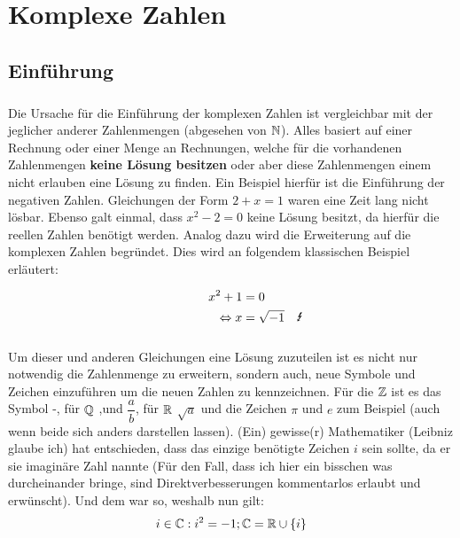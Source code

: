 \chapter{Komplexe Zahlen}


\section{Einführung}

	\paragraph{} Die Ursache für die Einführung der komplexen Zahlen ist vergleichbar mit der jeglicher anderer Zahlenmengen (abgesehen
	von $\mathbb{N}$). Alles basiert auf einer Rechnung oder einer Menge an Rechnungen, welche für die vorhandenen Zahlenmengen \textbf{keine Lösung besitzen} oder aber diese Zahlenmengen einem nicht erlauben eine Lösung zu finden. Ein Beispiel hierfür ist die Einführung der
	negativen Zahlen. Gleichungen der Form $2 + x = 1$ waren eine Zeit lang nicht lösbar. Ebenso galt einmal, dass $x^2 - 2 = 0$ keine
	Lösung besitzt, da hierfür die reellen Zahlen benötigt werden. Analog dazu wird die Erweiterung auf die komplexen Zahlen begründet.
	Dies wird an folgendem klassischen Beispiel erläutert:

	\begin{align*}
		\qquad \qquad x^2 + 1 &= 0 \\
			\Leftrightarrow x &= \sqrt{-1} \quad \text{\Lightning}
	\end{align*}

	\paragraph{} Um dieser und anderen Gleichungen eine Lösung zuzuteilen ist es nicht nur notwendig die Zahlenmenge zu erweitern, sondern
	auch, neue Symbole und Zeichen einzuführen um die neuen Zahlen zu kennzeichnen. Für die $\mathbb{Z}$ ist es das Symbol \dq-\dq, für $\mathbb{Q}$
	\dq,\dq und $\dfrac{a}{b}$, für $\mathbb{R}$ $\sqrt{a}$ und die Zeichen $\pi$ und $e$ zum Beispiel (auch wenn beide sich anders darstellen lassen). (Ein) gewisse(r) Mathematiker (Leibniz glaube ich) hat entschieden, dass das einzige benötigte Zeichen $i$ sein sollte, da er sie imaginäre Zahl nannte (Für den Fall, dass ich hier ein bisschen was durcheinander bringe, sind Direktverbesserungen kommentarlos erlaubt und erwünscht).
 	Und dem war so, weshalb nun gilt:
											$$i \in \C : i^2 = -1; \C \definedBy \R \cup \left\{i\right\}$$


